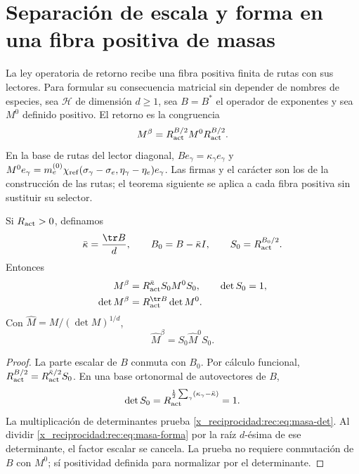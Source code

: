 \section{Separación de escala y forma en una fibra positiva de masas}

La ley operatoria de retorno recibe una fibra positiva finita de rutas con sus lectores. Para formular su consecuencia matricial sin depender de nombres de especies, sea \(\mathcal H\) de dimensión \(d\ge1\), sea \(B=B^*\) el operador de exponentes y sea \(M^0\) definido positivo. El retorno es la congruencia
\begin{equation}
 M^\beta=R_{\rm act}^{B/2}M^0R_{\rm act}^{B/2}.
 \label{x_reciprocidad:rec:eq:masa-operador}
\end{equation}
En la base de rutas del lector diagonal, \(Be_\gamma=\kappa_\gamma e_\gamma\) y
\(M^0e_\gamma=m_e^{(0)}\chi_{\rm ref}(\sigma_\gamma-\sigma_e,\eta_\gamma-\eta_e)e_\gamma\). Las firmas y el carácter son los de la construcción de las rutas; el teorema siguiente se aplica a cada fibra positiva sin sustituir su selector.

\begin{theorem}
\label{x_reciprocidad:rec:thm:masa}
Si \(R_{\rm act}>0\), definamos
\[
 \bar\kappa=\frac{\tr B}{d},\qquad B_0=B-\bar\kappa I,
 \qquad S_0=R_{\rm act}^{B_0/2}.
\]
Entonces
\begin{align}
 M^\beta&=R_{\rm act}^{\bar\kappa}S_0M^0S_0,
 \qquad\det S_0=1,\label{x_reciprocidad:rec:eq:masa-forma}\\
 \det M^\beta&=R_{\rm act}^{\tr B}\det M^0.\label{x_reciprocidad:rec:eq:masa-det}
\end{align}
Con \(\widehat M=M/(\det M)^{1/d}\),
\begin{equation}
 \widehat M^\beta=S_0\widehat M^0S_0.
 \label{x_reciprocidad:rec:eq:masa-normalizada}
\end{equation}
\end{theorem}
\begin{proof}
La parte escalar de \(B\) conmuta con \(B_0\). Por cálculo funcional,
\(R_{\rm act}^{B/2}=R_{\rm act}^{\bar\kappa/2}S_0\). En una base ortonormal de autovectores de \(B\),
\[
 \det S_0=R_{\rm act}^{\frac12\sum_\gamma(\kappa_\gamma-\bar\kappa)}=1.
\]
La multiplicación de determinantes prueba \eqref{x_reciprocidad:rec:eq:masa-det}. Al dividir \eqref{x_reciprocidad:rec:eq:masa-forma} por la raíz \(d\)-ésima de ese determinante, el factor escalar se cancela. La prueba no requiere conmutación de \(B\) con \(M^0\); sí positividad definida para normalizar por el determinante.
\end{proof}

